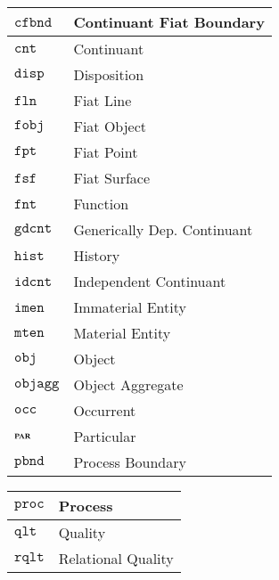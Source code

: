 \documentclass[ao]{iosart2x}
\newcommand{\cn}[1]{\mathtt{#1}}
\newcommand{\bfo}{{\textsc{bfo}}}
\newcommand{\cntbcat}{\cn{cnt}}
\newcommand{\idcntbcat}{\cn{idcnt}}
\newcommand{\gdcntbcat}{\cn{gdcnt}}
\newcommand{\mtenbcat}{\cn{mten}}
\newcommand{\imenbcat}{\cn{imen}}
\newcommand{\objbcat}{\cn{obj}}
\newcommand{\fobjbcat}{\cn{fobj}}
\newcommand{\objaggbcat}{\cn{objagg}}
\newcommand{\cfbndbcat}{\cn{cfbnd}}
\newcommand{\occbcat}{\cn{occ}}
\newcommand{\procbcat}{\cn{proc}}
\newcommand{\pbndbcat}{\cn{pbnd}}
\newcommand{\qltbcat}{\cn{qlt}}
\newcommand{\rqltbcat}{\cn{rqlt}}
\newcommand{\histbcat}{\cn{hist}}
\newcommand{\dispbcat}{\cn{disp}}
\newcommand{\fntbcat}{\cn{fnt}}
\newcommand{\fptbcat}{\cn{fpt}}
\newcommand{\flnbcat}{\cn{fln}}
\newcommand{\fsfbcat}{\cn{fsf}}
\newcommand{\bfopartic}{\textsc{par}}
\begin{document}

\begin{table*}
\caption{Categories of {\bfo}.}\label{table_cat_bfo}
\begin{minipage}{0.43\textwidth}
\hspace{30pt}
\begin{tabular}{|p{}|p{}|}\hline
$\cfbndbcat$ & Continuant Fiat Boundary\\\hline
$\cntbcat$ & Continuant \\\hline
$\dispbcat$ & Disposition \\\hline
$\flnbcat$ & Fiat Line \\\hline
$\fobjbcat$ & Fiat Object \\\hline
$\fptbcat$ & Fiat Point \\\hline
$\fsfbcat$ & Fiat Surface \\\hline
$\fntbcat$ & Function \\\hline
$\gdcntbcat$ & Generically Dep. Continuant \\\hline
$\histbcat$ & History \\\hline
$\idcntbcat$ & Independent Continuant \\\hline
$\imenbcat$ & Immaterial Entity \\\hline
$\mtenbcat$ & Material Entity \\\hline
$\objbcat$ & Object \\\hline
$\objaggbcat$ & Object Aggregate \\\hline
$\occbcat$ & Occurrent \\\hline
$\bfopartic$ & Particular \\\hline
$\pbndbcat$ & Process Boundary \\\hline
\end{tabular}
\end{minipage}%
\mbox{}\hfill{}
\begin{minipage}{0.43\textwidth}
  \hspace{-30pt}\begin{tabular}{|p{}|p{}|}
    \hline
$\procbcat$ & Process  \\\hline
$\qltbcat$ & Quality \\\hline
$\rqltbcat$ & Relational Quality \\\hline

\end{tabular}
\end{minipage}
\end{table*}
\end{document}
